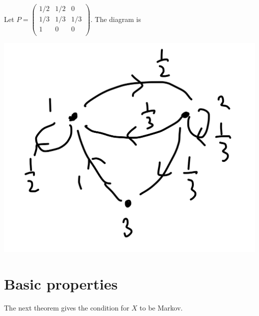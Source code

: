 \documentclass[a4paper]{article}
\begin{document}
\begin{example}
    Let $ P = \begin{pmatrix}
        1/2 & 1/2 & 0 \\
        1/3 & 1/3 & 1/3 \\
        1 & 0 & 0 \\
    \end{pmatrix} $. The diagram is
    \begin{center}
        \includegraphics[scale=0.09]{markov2.jpeg}
    \end{center}
\end{example}

\section{Basic properties}

The next theorem gives the condition for $X$ to be Markov.
\end{document}
